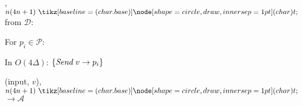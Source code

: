
\begin{bbox}[title={$\F_{\msf{bcast}} (\mathcal{D}, \mathcal{P}=p_1,...,p_n)$}]

\OnInput {}, $n(4n+1) \token$ from $\mathcal{D}$:
	\begin{renumerate}
	\item For $p_i \in \mathcal{P}$:
		\begin{ritemize}
		\item In $O(4 \Delta)$: $\{\emph{Send}~ v \rightarrow p_i\}$
		\end{ritemize}
	\item \Leak (input, $v$), $n(4n+1) \token$ $\rightarrow \mathcal{A}$
	\end{renumerate}

\end{bbox}
